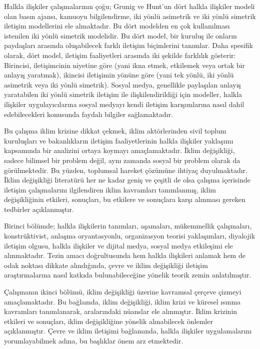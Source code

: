 \documentclass[
]{book}
\begin{document}
Halkla ilişkiler çalışmalarının çoğu; Grunig ve Hunt'un dört halkla ilişkiler modeli olan basın ajansı, kamuoyu bilgilendirme, iki yönlü asimetrik ve iki yönlü simetrik iletişim modellerini ele almaktadır. Bu dört modelden en çok kullanılması istenilen iki yönlü simetrik modelidir. Bu dört model, bir kuruluş ile onların paydaşları arasında oluşabilecek farklı iletişim biçimlerini tanımlar. Daha spesifik olarak, dört model, iletişim faaliyetleri arasında iki şekilde farklılık gösterir: Birincisi, iletişimcinin niyetine göre (yani ikna etmek, etkilemek veya ortak bir anlayış yaratmak), ikincisi iletişimin yönüne göre (yani tek yönlü, iki yönlü asimetrik veya iki yönlü simetrik). Sosyal medya, genellikle paylaşılan anlayış yaratabilen iki yönlü simetrik iletişim ile ilişkilendirildiği için modeller, halkla ilişkiler uygulayıcılarına sosyal medyayı kendi iletişim karışımlarına nasıl dahil edebilecekleri konusunda faydalı bilgiler sağlamaktadır. \citep{mavimbela2018perceived}

Bu çalışma iklim krizine dikkat çekmek, iklim aktörlerinden sivil toplum kuruluşları ve bakanlıkların iletişim faaliyetlerinin halkla ilişkiler yaklaşımı kapsamında bir analizini ortaya koymayı amaçlamaktadır. İklim değişikliği, sadece bilimsel bir problem değil, aynı zamanda sosyal bir problem olarak da görülmektedir. Bu yüzden, toplumsal hareket çözümüne ihtiyaç duyulmaktadır. \citep{hansen2020ireland} İklim değişikliği literatürü her ne kadar geniş ve çeşitli de olsa çalışma içerisinde iletişim çalışmalarını ilgilendiren iklim kavramları tanımlanmış, iklim değişikliğinin etkileri, sonuçları, bu etkilere ve sonuçlara karşı alınması gereken tedbirler açıklanmıştır.

Birinci bölümde; halkla ilişkilerin tanımları, aşamaları, mükemmellik çalışmaları, konstrüktivist, anlaşma oryantasyonlu, organizasyon teorisi yaklaşımları, diyalojik iletişim olgusu, halkla ilişkiler ve dijital medya, sosyal medya etkileşimi ele alınmaktadır. Tezin amacı doğrultusunda hem halkla ilişkileri anlamak hem de odak noktası dikkate alındığında, çevre ve iklim değişikliği iletişim araştırmalarına nasıl katkıda bulunabileceğine yönelik teorik zemin anlatılmıştır.

Çalışmanın ikinci bölümü, iklim değişikliği üzerine kavramsal çerçeve çizmeyi amaçlamaktadır. Bu bağlamda, iklim değişikliği, iklim krizi ve küresel ısınma kavramları tanımlanarak, aralarındaki nüanslar ele alınmıştır. İklim krizinin etkileri ve sonuçları, iklim değişikliğine yönelik alınabilecek önlemler açıklanmıştır. Çevre ve iklim iletişimi bağlamında, halkla ilişkiler uygulamalarını yorumlayabilmek adına, bu başlıklar önem arz etmektedir.
\end{document}
